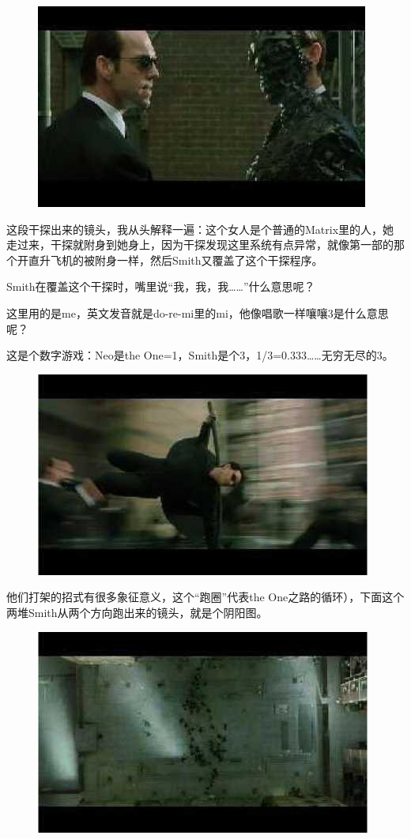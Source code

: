 \documentclass{ctexart}
\begin{document}
\begin{figure}[htb]
\centering
\includegraphics[width=0.5\linewidth]{fig/read_reloaded-75-1}
\end{figure}

这段干探出来的镜头，我从头解释一遍：这个女人是个普通的Matrix里的人，她走过来，干探就附身到她身上，因为干探发现这里系统有点异常，就像第一部的那个开直升飞机的被附身一样，然后Smith又覆盖了这个干探程序。

Smith在覆盖这个干探时，嘴里说“我，我，我……”什么意思呢？

这里用的是me，英文发音就是do-re-mi里的mi，他像唱歌一样嚷嚷3是什么意思呢？

这是个数字游戏：Neo是the One=1，Smith是个3，1/3=0.333……无穷无尽的3。

\newpage

\begin{figure}[htb]
\centering
\includegraphics[width=0.5\linewidth]{fig/read_reloaded-77}
\end{figure}

他们打架的招式有很多象征意义，这个“跑圈”代表the One之路的循环），下面这个两堆Smith从两个方向跑出来的镜头，就是个阴阳图。

\begin{figure}[htb]
\centering
\includegraphics[width=0.5\linewidth]{fig/read_reloaded-78}
\end{figure}
\end{document}
